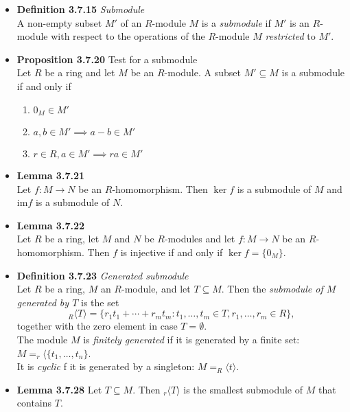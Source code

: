 \documentclass[11pt,a4paper]{article}
\begin{document}
\begin{itemize}
    \item \textbf{Definition 3.7.15} \emph{Submodule} \\
        A non-empty subset $M'$ of an $R$-module $M$ is a \emph{submodule} if $M'$ is an
        $R$-module with respect to the operations of the $R$-module $M$ \emph{restricted} to
        $M'$.

    \item \textbf{Proposition 3.7.20} Test for a submodule \\
        Let $R$ be a ring and let $M$ be an $R$-module.
        A subset $M' \subseteq M$ is a submodule if and only if
        \begin{enumerate}
            \item $0_M \in M'$
            \item $a,b \in M' \implies a-b \in M'$
            \item $r \in R, a \in M' \implies ra \in M'$
        \end{enumerate}

    \item \textbf{Lemma 3.7.21} \\
        Let $f : M \to N$ be an $R$-homomorphism.
        Then $\ker f$ is a submodule of $M$ and $\mathrm{im} f$ is a submodule of $N$.

    \item \textbf{Lemma 3.7.22} \\
        Let $R$ be a ring, let $M$ and $N$ be $R$-modules and let $f : M \to N$ be an
        $R$-homomorphism.
        Then $f$ is injective if and only if $\ker f = \{0_M\}$.

    \item \textbf{Definition 3.7.23} \emph{Generated submodule} \\
        Let $R$ be a ring, $M$ an $R$-module, and let $T \subseteq M$.
        Then the \emph{submodule of $M$ generated by $T$} is the set
        \[
            _R \langle T \rangle = \{{r_1}{t_1} + \cdots + {r_m}{t_m} : t_1, \ldots, t_m
                \in T, r_1, \ldots, r_m \in R \},
        \]
        together with the zero element in case $T = \emptyset$.\\
        The module $M$ is \emph{finitely generated} if it is generated by a finite set:
        $M = _r \langle \{ t_1, \ldots, t_n \}$. \\
        It is \emph{cyclic} f it is generated by a singleton:
        $M = _R \langle t \rangle$.

    \item \textbf{Lemma 3.7.28} Let $T \subseteq M$. Then $_r \langle T \rangle$
        is the smallest submodule of $M$ that contains $T$.


\end{itemize}
\end{document}
